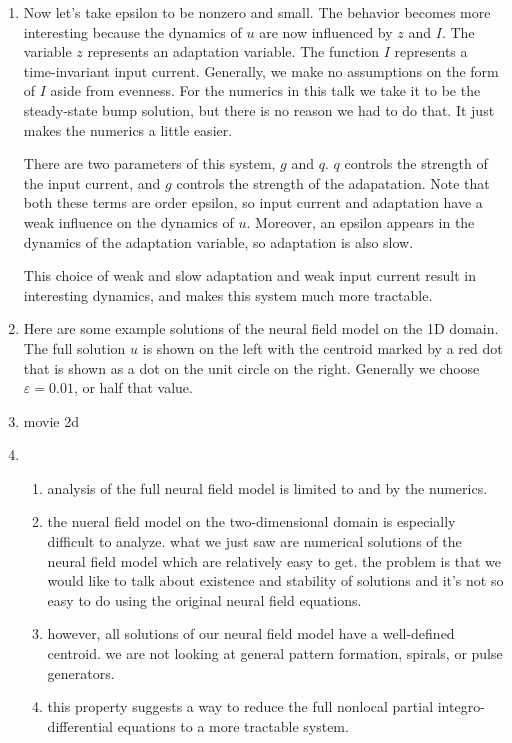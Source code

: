 \documentclass[a4paper,14pt]{article}
\newcommand{\ve}{\varepsilon}
\begin{document}
\begin{enumerate}
\item Now let's take epsilon to be nonzero and small. The behavior becomes more interesting because the dynamics of $u$ are now influenced by $z$ and $I$. The variable $z$ represents an adaptation variable. The function $I$ represents a time-invariant input current. Generally, we make no assumptions on the form of $I$ aside from evenness. For the numerics in this talk we take it to be the steady-state bump solution, but there is no reason we had to do that. It just makes the numerics a little easier.
 
 There are two parameters of this system, $g$ and $q$. $q$ controls the strength of the input current, and $g$ controls the strength of the adapatation. Note that both these terms are order epsilon, so input current and adaptation have a weak influence on the dynamics of $u$. Moreover, an epsilon appears in the dynamics of the adaptation variable, so adaptation is also slow.
 
 This choice of weak and slow adaptation and weak input current result in interesting dynamics, and makes this system much more tractable.
 \item Here are some example solutions of the neural field model on the 1D domain. The full solution $u$ is shown on the left with the centroid marked by a red dot that is shown as a dot on the unit circle on the right. Generally we choose $\ve = 0.01$, or half that value.
 \item movie 2d
 \item 
 \begin{enumerate}
 \item analysis of the full neural field model is limited to and by the numerics.
 \item the nueral field model on the two-dimensional domain is especially difficult to analyze. what we just saw are numerical solutions of the neural field model which are relatively easy to get. the problem is that we would like to talk about existence and stability of solutions and it's not so easy to do using the original neural field equations.
 \item however, all solutions of our neural field model have a well-defined centroid. we are not looking at general pattern formation, spirals, or pulse generators.
 \item this property suggests a way to reduce the full nonlocal partial integro-differential equations to a more tractable system.
 \end{enumerate}
  

\end{enumerate}
\end{document}
